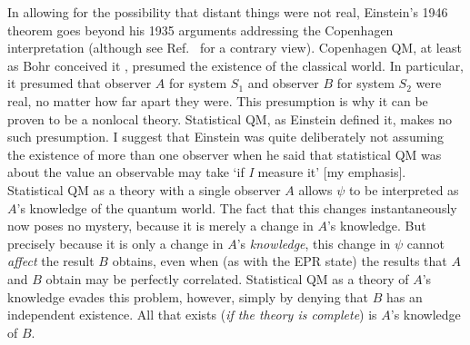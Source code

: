 \documentclass[12pt]{iopart}
\begin{document}
In allowing for the possibility that distant things were not real, Einstein's 1946 theorem goes beyond his 1935 arguments addressing the Copenhagen interpretation (although see Ref.~\cite{How85} for a contrary view). Copenhagen QM, at least as Bohr conceived it \cite{Bel99}, presumed the existence of the classical world. In particular, it presumed that observer $A$ for system $S_1$ and observer $B$ for system $S_2$ were real, no matter how far apart they were. This presumption is why it can be proven to be a nonlocal theory. Statistical QM, as Einstein defined it, makes no such presumption. I suggest that Einstein was quite deliberately not assuming the existence of more than one observer when he said that statistical QM was about the value an observable may take `if {\em I} measure it' [my emphasis]. Statistical QM as a theory with a single observer $A$  allows $\psi$ to be interpreted as $A$'s knowledge of the quantum world. The fact that this changes instantaneously now poses no mystery, because it is merely a change in $A$'s knowledge. But precisely because it is only a change in $A$'s {\em knowledge}, this change in $\psi$ cannot {\em affect} the result $B$ obtains, even when (as with the EPR state) the results that $A$ and $B$ obtain may be perfectly correlated.  Statistical QM as a theory of $A$'s knowledge evades this problem, however, simply by denying that $B$ has an independent existence. All that exists ({\em if the theory is complete}) is $A$'s knowledge of $B$.
\end{document}
